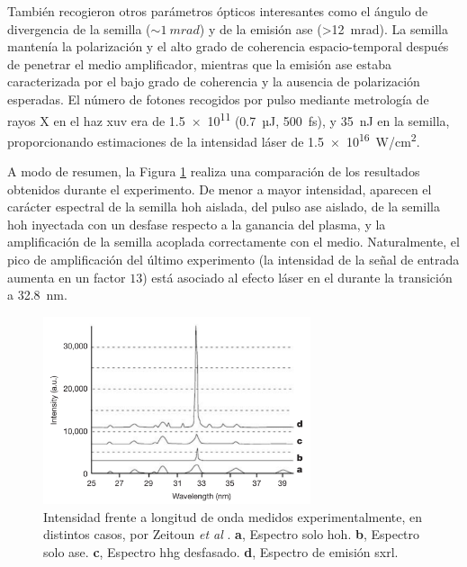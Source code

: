 También recogieron otros parámetros ópticos interesantes como el ángulo de divergencia de la semilla ($\sim \qty{1}{mrad}$) y de la emisión \acrshort{ase} (>\qty{12}{mrad}). La semilla mantenía la polarización y el alto grado de coherencia espacio-temporal después de penetrar el medio amplificador, mientras que la emisión \acrshort{ase} estaba caracterizada por el bajo grado de coherencia y la ausencia de polarización esperadas. El número de fotones recogidos por pulso mediante metrología de rayos X en el haz \acrshort{xuv} era de \num{1.5e11} (\qty{0.7}{µJ}, \qty{500}{fs}), y \qty{35}{nJ} en la semilla, proporcionando estimaciones de la intensidad láser de \qty{1.5e16}{W/cm^2}.

A modo de resumen, la Figura \ref{fig:1.25} realiza una comparación de los resultados obtenidos durante el experimento. De menor a mayor intensidad, aparecen el carácter espectral de la semilla \acrshort{hoh} aislada, del pulso \acrshort{ase} aislado, de la semilla \acrshort{hoh} inyectada con un desfase respecto a la ganancia del plasma, y la amplificación de la semilla acoplada correctamente con el medio. Naturalmente, el pico de amplificación del último experimento (la intensidad de la señal de entrada aumenta en un factor $13$) está asociado al efecto láser en el  durante la transición a \qty{32.8}{nm}.

\begin{figure}[htbp]
  \centering
  \includegraphics[width=0.7\textwidth]{Figuras/ch1_espectro_hhg.png}
  \caption{Intensidad frente a longitud de onda medidos experimentalmente, en distintos casos, por Zeitoun \emph{et al} \autocite{Zeitoun2004}. \textbf{a}, Espectro solo \acrshort{hoh}. \textbf{b}, Espectro solo \acrshort{ase}. \textbf{c}, Espectro \acrshort{hhg} desfasado. \textbf{d}, Espectro de emisión \acrshort{sxrl}.}
  \label{fig:1.25}
\end{figure}


